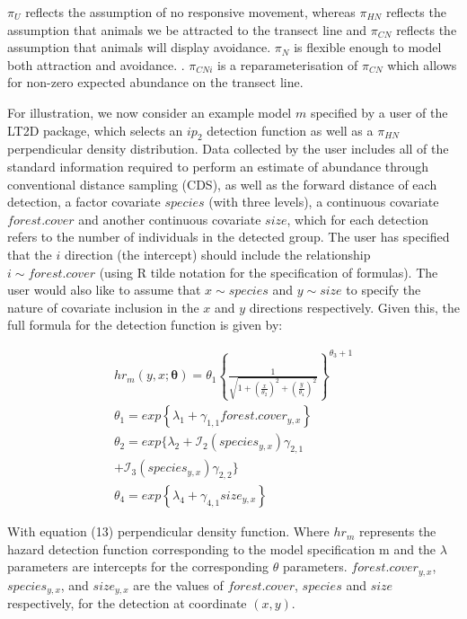 \documentclass[11pt]{article}
\begin{document}
\begin{multicols}{2}
$\pi_U$ reflects the assumption of no responsive movement, whereas $\pi_{HN}$ reflects the assumption that animals we be attracted to the transect line and $\pi_{CN}$ reflects the assumption that animals will display avoidance. $\pi_N$ is flexible enough to model both attraction and avoidance. \cite{Borchers}. $\pi_{CNi}$ is a reparameterisation of $\pi_{CN}$ which allows for non-zero expected abundance on the transect line.

For illustration, we now consider an example model $m$ specified by a user of the LT2D package, which selects an $ip_2$ detection function as well as a $\pi_{HN}$ perpendicular density distribution. Data collected by the user includes all of the standard information required to perform an estimate of abundance through conventional distance sampling (CDS), as well as the forward distance of each detection, a factor covariate $species$ (with three levels), a continuous covariate $forest.cover$ and another continuous covariate $size$, which for each detection refers to the number of individuals in the detected group. The user has specified that the $i$ direction (the intercept) should include the relationship $i\sim forest.cover$ (using R tilde notation for the specification of formulas). The user would also like to assume that $x\sim species$ and $y\sim size$ to specify the nature of covariate inclusion in the $x$ and $y$ directions respectively. Given this, the full formula for the detection function is given by:

\begin{multline}
hr_m\left(y,x;\boldsymbol{\theta}\right) = \theta_1\left\{\frac{1}{\sqrt{1+\left(\frac{x}{\theta_2}\right)^2+\left(\frac{y}{\theta_4}\right)^2}}\right\}^{\theta_3 + 1}\\\theta_1=exp\left\{{\lambda_1 + \gamma_{1,1}forest.cover_{y,x}}\right\} \\\theta_2 = exp\{\lambda_2 + \mathcal{I}_2\left(species_{y,x}\right)\gamma_{2,1}\\ +\mathcal{I}_3\left(species_{y,x}\right)\gamma_{2,2}\}  \\\theta_4 = exp\left\{\lambda_4 + \gamma_{4,1}size_{y,x}\right\}
\end{multline}

With equation (13) perpendicular density function. Where $hr_m$ represents the hazard detection function corresponding to the model specification m and the $\lambda$ parameters are intercepts for the corresponding $\theta$ parameters. $forest.cover_{y,x}$, $species_{y,x}$, and $size_{y,x}$ are the values of $forest.cover$, $species$ and $size$ respectively, for the detection at coordinate $(x,y)$.


\end{multicols}
\end{document}
